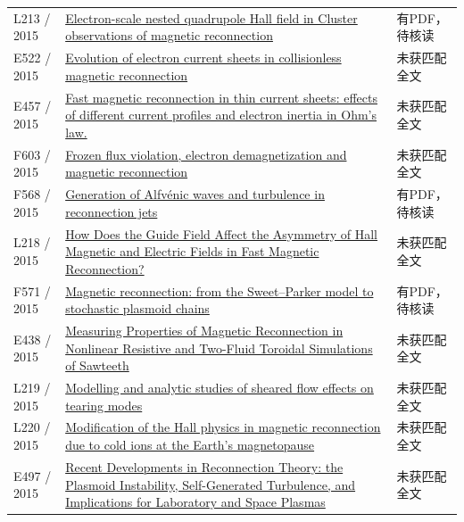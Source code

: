 \begin{longtable}{P{24mm}P{97mm}P{27mm}}
L213 / 2015 & \href{https://doi.org/10.5194/angeo-33-719-2015}{Electron-scale nested quadrupole Hall field in Cluster observations of magnetic reconnection} & 有PDF，待核读\\

E522 / 2015 & \href{https://doi.org/10.1063/1.4933120}{Evolution of electron current sheets in collisionless magnetic reconnection} & 未获匹配全文\\

E457 / 2015 & \href{http://ui.adsabs.harvard.edu/abs/2015EGUGA..17.7964P/abstract}{Fast magnetic reconnection in thin current sheets: effects of different current profiles and electron inertia in Ohm's law.} & 未获匹配全文\\

F603 / 2015 & \href{https://doi.org/10.1063/1.4932332}{Frozen flux violation,  electron demagnetization and magnetic reconnection} & 未获匹配全文\\

F568 / 2015 & \href{https://doi.org/10.1002/2014ja020520}{Generation of Alfvénic waves and turbulence in reconnection jets} & 有PDF，待核读\\

L218 / 2015 & \href{https://doi.org/10.1088/0256-307x/32/9/095202}{How Does the Guide Field Affect the Asymmetry of Hall Magnetic and Electric Fields in Fast Magnetic Reconnection?} & 未获匹配全文\\

F571 / 2015 & \href{https://doi.org/10.1088/0741-3335/58/1/014021}{Magnetic reconnection: from the Sweet–Parker model to stochastic plasmoid chains} & 有PDF，待核读\\

E438 / 2015 & \href{http://absimage.aps.org/image/DPP15/MWS_DPP15-2015-001543.pdf}{Measuring Properties of Magnetic Reconnection in Nonlinear Resistive and Two-Fluid Toroidal Simulations of Sawteeth} & 未获匹配全文\\

L219 / 2015 & \href{https://doi.org/10.1088/0029-5515/55/5/053016}{Modelling and analytic studies of sheared flow effects on tearing modes} & 未获匹配全文\\

L220 / 2015 & \href{https://doi.org/10.1002/2015gl065129}{Modification of the Hall physics in magnetic reconnection due to cold ions at the Earth's magnetopause} & 未获匹配全文\\

E497 / 2015 & \href{http://absimage.aps.org/image/DPP15/MWS_DPP15-2015-001927.pdf}{Recent Developments in Reconnection Theory: the Plasmoid Instability,  Self-Generated Turbulence,  and Implications for Laboratory and Space Plasmas} & 未获匹配全文\\


\end{longtable}
